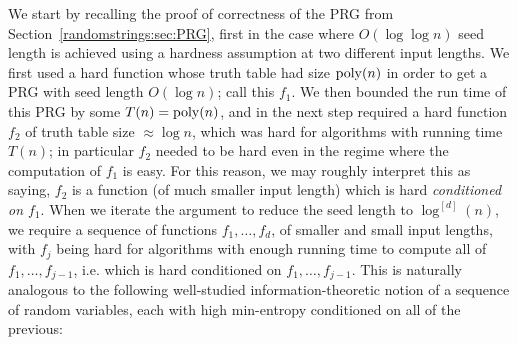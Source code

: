 We start by recalling the proof of correctness of the PRG from Section~\ref{randomstrings:sec:PRG}, first in the case where $O(\log \log n)$ seed length is achieved using a hardness assumption at two different input lengths. We first used a hard function whose truth table had size $\mathrm{poly}(n)$ in order to get a PRG with seed length $O(\log n)$; call this $f_1$. We then bounded the run time of this PRG by some $T(n) = \mathrm{poly}(n)$, and in the next step required a hard function $f_2$ of truth table size $\approx \log n$, which was hard for algorithms with running time $T(n)$; in particular $f_2$ needed to be hard even in the regime where the computation of $f_1$ is easy. For this reason, we may roughly interpret this as saying, $f_2$ is a function (of much smaller input length) which is hard \emph{conditioned on $f_1$}. 
When we iterate the argument to reduce the seed length to $\log^{[d]}(n)$, we require a sequence of functions $f_1,\ldots,f_d$, of smaller and small input lengths, with $f_j$ being hard for algorithms with enough running time to compute all of $f_1,\ldots,f_{j-1}$, i.e. which is hard conditioned on $f_1,\ldots,f_{j-1}$. This is naturally analogous to the following well-studied information-theoretic notion of a sequence of random variables, each with high min-entropy conditioned on all of the previous:

